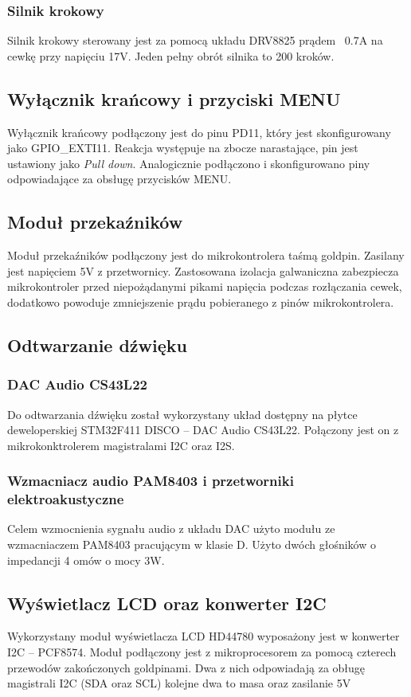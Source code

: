 \documentclass[10pt, a4paper]{article}
\begin{document}
\subsubsection{Silnik krokowy}
Silnik krokowy sterowany jest za pomocą układu DRV8825 prądem ~0.7A na cewkę przy napięciu 17V. Jeden pełny obrót silnika to 200 kroków. 

\subsection{Wyłącznik krańcowy i przyciski MENU}
Wyłącznik krańcowy podłączony jest do pinu PD11, który jest skonfigurowany jako GPIO{\_}EXTI11. Reakcja występuje na zbocze narastające, pin jest ustawiony jako \emph{Pull down}. 
Analogicznie podłączono i skonfigurowano piny odpowiadające za obsługę przycisków MENU.

\subsection{Moduł przekaźników}
Moduł przekaźników podłączony jest do mikrokontrolera taśmą goldpin. Zasilany jest napięciem 5V z przetwornicy. Zastosowana izolacja galwaniczna zabezpiecza mikrokontroler przed niepożądanymi pikami napięcia podczas rozłączania cewek, dodatkowo powoduje zmniejszenie prądu pobieranego z pinów mikrokontrolera.

\subsection{Odtwarzanie dźwięku}
\subsubsection{DAC Audio CS43L22}
Do odtwarzania dźwięku został wykorzystany układ dostępny na płytce deweloperskiej STM32F411 DISCO -- DAC Audio CS43L22. Połączony jest on z mikrokonktrolerem magistralami I2C oraz I2S.

\subsubsection{Wzmacniacz audio PAM8403 i przetworniki elektroakustyczne}
Celem wzmocnienia sygnału audio z układu DAC użyto modułu ze wzmacniaczem PAM8403 pracującym w klasie D. Użyto dwóch głośników o impedancji 4 omów o mocy 3W.

\newpage

\subsection{Wyświetlacz LCD oraz konwerter I2C}
Wykorzystany moduł wyświetlacza LCD HD44780 wyposażony jest w konwerter I2C -- PCF8574. Moduł podłączony jest z mikroprocesorem za pomocą czterech przewodów zakończonych goldpinami. Dwa z nich odpowiadają za obługę magistrali I2C (SDA oraz SCL) kolejne dwa to masa oraz zasilanie 5V
\end{document}

